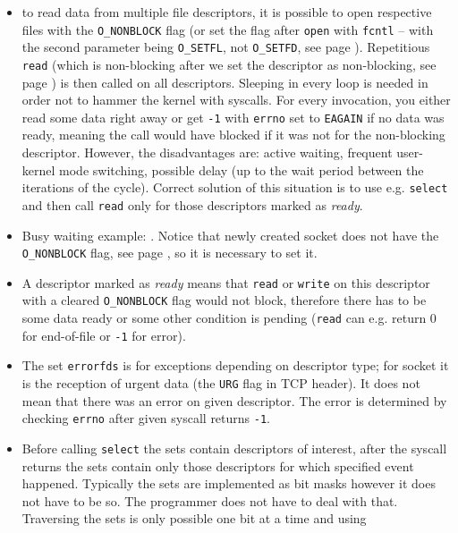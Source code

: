\begin{itemize}
\item {} to read data from multiple file descriptors, it is
possible to open respective files with the \texttt{O\_NONBLOCK} flag
(or set the flag after \texttt{open} with \texttt{fcntl} -- with the second
parameter being \texttt{O\_SETFL}, not \texttt{O\_SETFD}, see page
\pageref{FCNTL}).  Repetitious \texttt{read} (which is non-blocking after we set
the descriptor as non-blocking, see page \pageref{OPEN}) is then called on all
descriptors.  Sleeping in every loop is needed in order not to hammer the kernel
with syscalls.  For every invocation, you either read some data right away or get
\texttt{-1} with \texttt{errno} set to \texttt{EAGAIN} if no data was ready,
meaning the call would have blocked if it was not for the non-blocking
descriptor.  However, the disadvantages are: active waiting, frequent
user-kernel mode switching, possible delay (up to the wait period between the
iterations of the cycle).  Correct solution of this situation is to use e.g.
\texttt{select} and then call \texttt{read} only for those descriptors marked as
\emph{ready}.
\item {} Busy waiting example: .
Notice that newly created socket does not have the \texttt{O\_NONBLOCK} flag,
see page \pageref{ACCEPT}, so it is necessary to set it.
\item A descriptor marked as \emph{ready} means that \texttt{read} or
\texttt{write} on this descriptor with a cleared \texttt{O\_NONBLOCK} flag would
not block, therefore there has to be some data ready or some other condition is
pending (\texttt{read} can e.g. return 0 for end-of-file or \texttt{-1} for
error).
\item The set \texttt{errorfds} is for exceptions depending on descriptor type;
for socket it is the reception of urgent data (the \texttt{URG} flag in TCP
header). It does not mean that there was an error on given descriptor.  The
error is determined by checking \texttt{errno} after given syscall returns
\texttt{-1}.
\item Before calling \texttt{select} the sets contain descriptors of interest,
after the syscall returns the sets contain only those descriptors for which 
specified event happened.   Typically the sets are implemented as bit
masks however it does not have to be so. The programmer does not have to deal
with that. Traversing the sets is only possible one bit at a time and using

\end{itemize}

